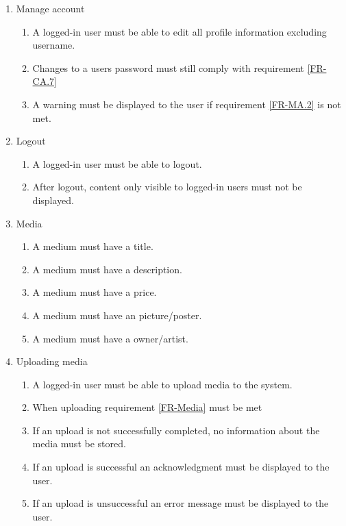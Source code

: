 \documentclass[../report.tex]{subfiles}
\begin{document}
\begin{enumerate}
		
		\item Manage account
			\begin{enumerate}
				\item A logged-in user must be able to edit all profile information excluding username.
				
				\item Changes to a users password must still comply with requirement \ref{FR-CA.7} \label{FR-MA.2}
				\item A warning must be displayed to the user if requirement \ref{FR-MA.2} is not met.	
			\end{enumerate}
			
			
		\item Logout
			\begin{enumerate}
				\item A logged-in user must be able to logout.
				\item After logout, content only visible to logged-in users must not be displayed.
			\end{enumerate}
			
		
		\item Media \label{FR-Media}
			\begin{enumerate}
				\item A medium must have a title.
				\item A medium must have a description.
				\item A medium must have a price.
				\item A medium must have an picture/poster.
				\item A medium must have a owner/artist.
			\end{enumerate}

		\item Uploading media
			\begin{enumerate}
				\item A logged-in user must be able to upload media to the system.
				\item When uploading requirement \ref{FR-Media} must be met
				\item If an upload is not successfully completed, no information about the media must be stored.
				\item If an upload is successful an acknowledgment must be displayed to the user.
				\item If an upload is unsuccessful an error message must be displayed to the user. 
			\end{enumerate}


\end{enumerate}
\end{document}
